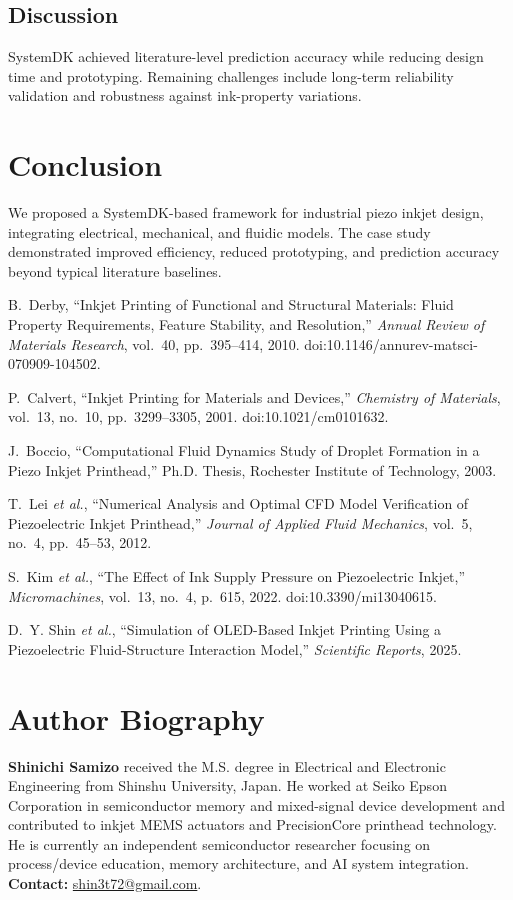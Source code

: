 \documentclass[conference]{IEEEtran}
\begin{document}
\subsection{Discussion}
SystemDK achieved literature-level prediction accuracy while reducing design time and prototyping. Remaining challenges include long-term reliability validation and robustness against ink-property variations.

\section{Conclusion}
We proposed a SystemDK-based framework for industrial piezo inkjet design, integrating electrical, mechanical, and fluidic models. The case study demonstrated improved efficiency, reduced prototyping, and prediction accuracy beyond typical literature baselines.

\begin{thebibliography}{99}

B.~Derby, ``Inkjet Printing of Functional and Structural Materials: Fluid Property Requirements, Feature Stability, and Resolution,'' \emph{Annual Review of Materials Research}, vol.~40, pp.~395--414, 2010. doi:10.1146/annurev-matsci-070909-104502.

P.~Calvert, ``Inkjet Printing for Materials and Devices,'' \emph{Chemistry of Materials}, vol.~13, no.~10, pp.~3299--3305, 2001. doi:10.1021/cm0101632.

J.~Boccio, ``Computational Fluid Dynamics Study of Droplet Formation in a Piezo Inkjet Printhead,'' Ph.D. Thesis, Rochester Institute of Technology, 2003.

T.~Lei \emph{et al.}, ``Numerical Analysis and Optimal CFD Model Verification of Piezoelectric Inkjet Printhead,'' \emph{Journal of Applied Fluid Mechanics}, vol.~5, no.~4, pp.~45--53, 2012.

S.~Kim \emph{et al.}, ``The Effect of Ink Supply Pressure on Piezoelectric Inkjet,'' \emph{Micromachines}, vol.~13, no.~4, p.~615, 2022. doi:10.3390/mi13040615.

D.~Y. Shin \emph{et al.}, ``Simulation of OLED-Based Inkjet Printing Using a Piezoelectric Fluid-Structure Interaction Model,'' \emph{Scientific Reports}, 2025.

\end{thebibliography}

\section*{Author Biography}
\textbf{Shinichi Samizo} received the M.S. degree in Electrical and Electronic Engineering from Shinshu University, Japan. He worked at Seiko Epson Corporation in semiconductor memory and mixed-signal device development and contributed to inkjet MEMS actuators and PrecisionCore printhead technology. He is currently an independent semiconductor researcher focusing on process/device education, memory architecture, and AI system integration. \textbf{Contact:} \href{mailto:shin3t72@gmail.com}{shin3t72@gmail.com}.
\end{document}
